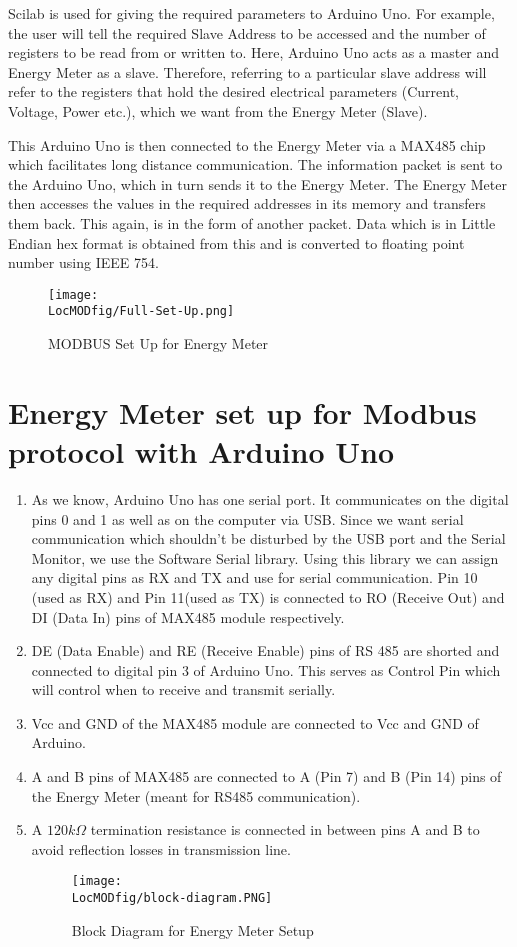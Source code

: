 Scilab is used for giving the required parameters to Arduino Uno. For example, the user will tell the required Slave Address to be accessed and the number of registers to be read from or written to. Here, Arduino Uno acts as a master and Energy Meter as a slave. Therefore, referring to a particular slave address will refer to the registers that hold the desired electrical parameters (Current, Voltage, Power etc.), which we want from the Energy Meter (Slave).

This Arduino Uno is then connected to the Energy Meter via a MAX485 chip which facilitates long distance communication. The information packet is sent to the Arduino Uno, which in turn sends it to the Energy Meter. The Energy Meter then accesses the values in the required addresses in its memory and transfers them back. This again, is in the form of another packet. Data which is in Little Endian hex format is obtained from this and is converted to floating point number using IEEE 754.

\begin{figure}
\centering
\texttt{[image: \\LocMODfig/Full-Set-Up.png]}
\caption{MODBUS Set Up for Energy Meter}
\label{fig:full-set-up}
\end{figure}

\section{Energy Meter set up for Modbus protocol with Arduino Uno} \begin{enumerate}
\item As we know, Arduino Uno has one serial port. It communicates on the digital pins 0 and 1 as well as on the computer via USB. Since we want serial communication which shouldn't be disturbed by the USB port and the Serial Monitor, we use the Software Serial library. Using this library we can assign any digital pins as RX and TX and use for serial communication. Pin 10 (used as RX) and Pin 11(used as TX) is connected to RO (Receive Out) and DI (Data In) pins of MAX485 module respectively.
\item DE (Data Enable) and RE (Receive Enable) pins of RS 485 are shorted and connected to digital pin 3 of Arduino Uno. This serves as Control Pin which will control when to receive and transmit serially.
\item Vcc and GND of the MAX485 module are connected to Vcc and GND of Arduino.
\item A and B pins of MAX485 are connected to A (Pin 7) and B (Pin 14)  pins of the Energy Meter (meant for RS485 communication).
\item A $120k\Omega$  termination resistance is connected in between pins A and B to avoid reflection losses in transmission line.

\begin{figure}
\centering
\texttt{[image: \\LocMODfig/block-diagram.PNG]}
\caption{Block Diagram for Energy Meter Setup}
\label{fig:block-diagram}
\end{figure}

\end{enumerate}


